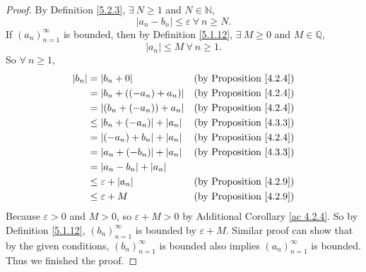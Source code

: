 \begin{proof}
By Definition \ref{5.2.3}, \(\exists\ N \geq 1\) and \(N \in \mathds{N}\),
\[
    |a_n - b_n| \leq \varepsilon \ \forall\ n \geq N.
\]
If \((a_n)_{n = 1}^{\infty}\) is bounded, then by Definition \ref{5.1.12}, \(\exists\ M \geq 0\) and \(M \in \mathds{Q}\),
\[
    |a_n| \leq M \ \forall\ n \geq 1.
\]
So \(\forall\ n \geq 1\),
\begin{align*}
|b_n| &= |b_n + 0| & \text{(by Proposition \ref{4.2.4})} \\
&= |b_n + ((-a_n) + a_n)| & \text{(by Proposition \ref{4.2.4})} \\
&= |(b_n + (-a_n)) + a_n| & \text{(by Proposition \ref{4.2.4})} \\
&\leq |b_n + (-a_n)| + |a_n| & \text{(by Proposition \ref{4.3.3})} \\
&= |(-a_n) + b_n| + |a_n| & \text{(by Proposition \ref{4.2.4})} \\
&= |a_n + (-b_n)| + |a_n| & \text{(by Proposition \ref{4.3.3})} \\
&= |a_n - b_n| + |a_n| \\
&\leq \varepsilon + |a_n| & \text{(by Proposition \ref{4.2.9})} \\
&\leq \varepsilon + M & \text{(by Proposition \ref{4.2.9})} \\
\end{align*}
Because \(\varepsilon > 0\) and \(M > 0\), so \(\varepsilon + M > 0\) by Additional Corollary \ref{ac 4.2.4}.
So by Definition \ref{5.1.12}, \((b_n)_{n = 1}^{\infty}\) is bounded by \(\varepsilon + M\).
Similar proof can show that by the given conditions, \((b_n)_{n = 1}^{\infty}\) is bounded also implies \((a_n)_{n = 1}^{\infty}\) is bounded.
Thus we finished the proof.
\end{proof}